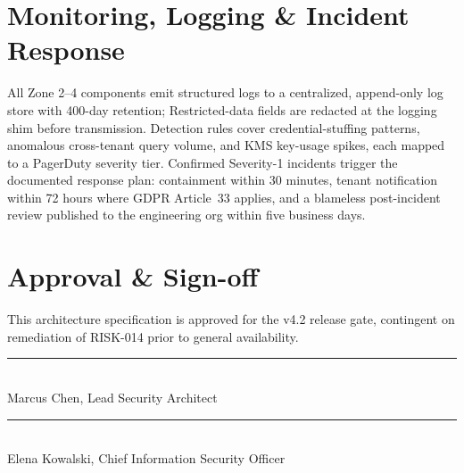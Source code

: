 \documentclass[11pt,a4paper,parskip=half]{scrreprt}
\begin{document}
\section{Monitoring, Logging \& Incident Response}

All Zone 2--4 components emit structured logs to a centralized, append-only log store with
400-day retention; Restricted-data fields are redacted at the logging shim before transmission.
Detection rules cover credential-stuffing patterns, anomalous cross-tenant query volume, and
KMS key-usage spikes, each mapped to a PagerDuty severity tier. Confirmed Severity-1 incidents
trigger the documented response plan: containment within 30 minutes, tenant notification within
72 hours where GDPR Article~33 applies, and a blameless post-incident review published to the
engineering org within five business days.

\section*{Approval \& Sign-off}

\noindent This architecture specification is approved for the v4.2 release gate, contingent on
remediation of RISK-014 prior to general availability.

\vspace{0.8cm}
\noindent
\begin{minipage}[t]{0.48\textwidth}
\rule{\linewidth}{0.4pt}\\[2pt]
Marcus Chen, Lead Security Architect
\end{minipage}\hfill
\begin{minipage}[t]{0.48\textwidth}
\rule{\linewidth}{0.4pt}\\[2pt]
Elena Kowalski, Chief Information Security Officer
\end{minipage}
\par
\end{document}
